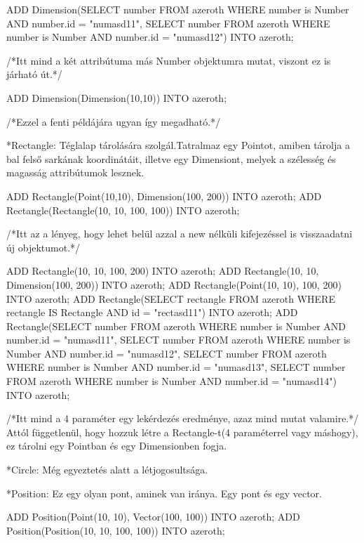 \begin{sql}
ADD Dimension(SELECT number FROM azeroth WHERE number is Number AND number.id = "numasd11", SELECT number FROM azeroth WHERE number is Number AND number.id = "numasd12") INTO azeroth;
\end{sql}

/*Itt mind a két attribútuma más Number objektumra mutat, viszont ez is járható út.*/
\begin{sql}
ADD Dimension(Dimension(10,10)) INTO azeroth;
\end{sql}

/*Ezzel a fenti példájára ugyan így megadható.*/

*Rectangle: Téglalap tárolására szolgál.Tatralmaz egy Pointot, amiben tárolja a bal felső sarkának koordinátáit, illetve egy Dimensiont, melyek a szélesség és magasság attribútumok lesznek.

\begin{sql}
ADD Rectangle(Point(10,10), Dimension(100, 200)) INTO azeroth;
ADD Rectangle(Rectangle(10, 10, 100, 100)) INTO azeroth;
\end{sql}
/*Itt az a lényeg, hogy lehet belül azzal a new nélküli kifejezéssel is visszaadatni új objektumot.*/
\begin{sql}
ADD Rectangle(10, 10, 100, 200) INTO azeroth;
ADD Rectangle(10, 10, Dimension(100, 200)) INTO azeroth;
ADD Rectangle(Point(10, 10), 100, 200) INTO azeroth;
ADD Rectangle(SELECT rectangle FROM azeroth WHERE rectangle IS Rectangle AND id = "rectasd11") INTO azeroth;
ADD Rectangle(SELECT number FROM azeroth WHERE number is Number AND number.id = "numasd11", SELECT number FROM azeroth WHERE number is Number AND number.id = "numasd12", SELECT number FROM azeroth WHERE number is Number AND number.id = "numasd13", SELECT number FROM azeroth WHERE number is Number AND number.id = "numasd14") INTO azeroth;
\end{sql}

/*Itt mind a 4 paraméter egy lekérdezés eredménye, azaz mind mutat valamire.*/
Attól függetlenül, hogy hozzuk létre a Rectangle-t(4 paraméterrel vagy máshogy),  ez tárolni egy Pointban és egy Dimensionben fogja.

*Circle: Még egyeztetés alatt a létjogosultsága.


*Position: Ez egy olyan pont, aminek van iránya. Egy pont és egy vector.
\begin{sql}
ADD Position(Point(10, 10),  Vector(100, 100)) INTO azeroth;
ADD Position(Position(10, 10, 100, 100)) INTO azeroth;
\end{sql}

